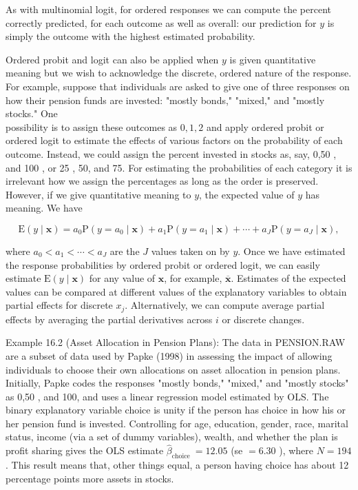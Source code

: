\documentclass[10pt]{article}
\begin{document}
As with multinomial logit, for ordered responses we can compute the percent correctly predicted, for each outcome as well as overall: our prediction for $y$ is simply the outcome with the highest estimated probability.

Ordered probit and logit can also be applied when $y$ is given quantitative meaning but we wish to acknowledge the discrete, ordered nature of the response. For example, suppose that individuals are asked to give one of three responses on how their pension funds are invested: "mostly bonds," "mixed," and "mostly stocks." One\\
possibility is to assign these outcomes as $0,1,2$ and apply ordered probit or ordered logit to estimate the effects of various factors on the probability of each outcome. Instead, we could assign the percent invested in stocks as, say, 0,50 , and 100 , or 25 , 50, and 75. For estimating the probabilities of each category it is irrelevant how we assign the percentages as long as the order is preserved. However, if we give quantitative meaning to $y$, the expected value of $y$ has meaning. We have


\begin{equation*}
\mathrm{E}(y \mid \mathbf{x})=a_{0} \mathrm{P}\left(y=a_{0} \mid \mathbf{x}\right)+a_{1} \mathrm{P}\left(y=a_{1} \mid \mathbf{x}\right)+\cdots+a_{J} \mathrm{P}\left(y=a_{J} \mid \mathbf{x}\right), \tag{16.25}
\end{equation*}


where $a_{0}<a_{1}<\cdots<a_{J}$ are the $J$ values taken on by $y$. Once we have estimated the response probabilities by ordered probit or ordered logit, we can easily estimate $\mathrm{E}(y \mid \mathbf{x})$ for any value of $\mathbf{x}$, for example, $\overline{\mathbf{x}}$. Estimates of the expected values can be compared at different values of the explanatory variables to obtain partial effects for discrete $x_{j}$. Alternatively, we can compute average partial effects by averaging the partial derivatives across $i$ or discrete changes.

Example 16.2 (Asset Allocation in Pension Plans): The data in PENSION.RAW are a subset of data used by Papke (1998) in assessing the impact of allowing individuals to choose their own allocations on asset allocation in pension plans. Initially, Papke codes the responses "mostly bonds," "mixed," and "mostly stocks" as 0,50 , and 100, and uses a linear regression model estimated by OLS. The binary explanatory variable choice is unity if the person has choice in how his or her pension fund is invested. Controlling for age, education, gender, race, marital status, income (via a set of dummy variables), wealth, and whether the plan is profit sharing gives the OLS estimate $\hat{\beta}_{\text {choice }}=12.05$ (se $=6.30$ ), where $N=194$. This result means that, other things equal, a person having choice has about 12 percentage points more assets in stocks.
\end{document}
